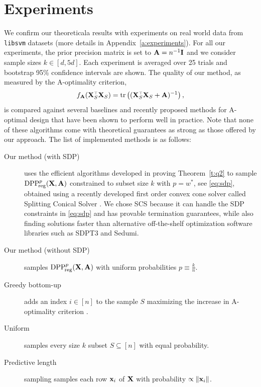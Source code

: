 \section{Experiments}\label{s:bayesian:experiments}
We confirm our theoreticala
results with experiments on real world data from \texttt{libsvm} datasets
\citep{libsvm} (more details in Appendix~\ref{a:experiments}).
For all our experiments, the prior precision matrix is set to $\mathbf A = n^{-1} \mathbf I$
and we consider sample sizes $k \in [d, 5d]$. Each experiment is
averaged over 25 trials and bootstrap 95\% confidence intervals are shown.
The quality of our method, as measured by the A-optimality
criterion,
\[f_{\A}(\X_S^\top \X_S) = \tr \left((\X_S^\top \X_S + \A)^{-1}\right),\]
is compared against several baselines and recently proposed methods
for A-optimal design that have been shown to perform well in
practice. Note that none of these algorithms come with theoretical
guarantees as strong as those offered by our approach. The list of
implemented methods is as follows:
\begin{description}
    \item[Our method (with SDP)] uses the efficient algorithms
        developed in proving Theorem~\ref{t:q2} to sample
        ${{\mathrm{DPP}}_{\!\mathrm{reg}}^{p}}(\mathbf X,\mathbf A)$ constrained to subset size $k$
        with $p = w^*$, see \eqref{eq:sdp},
        obtained using a         recently developed first order convex cone solver called Splitting
        Conical Solver \citep[SCS, see][]{o2016conic}.
        We chose SCS because it can handle the SDP constraints in
        \eqref{eq:sdp} and has provable termination guarantees, while
        also finding solutions faster \citep{o2016conic} than alternative
        off-the-shelf optimization software libraries such as SDPT3
        and Sedumi.

    \item[Our method (without SDP)] samples ${{\mathrm{DPP}}_{\!\mathrm{reg}}^{p}}(\mathbf X,\mathbf A)$ with uniform
        probabilities $p \equiv \frac{k}{n}$.

    \item[Greedy bottom-up] adds an index $i \in [n]$ to the sample $S$
        maximizing the increase in A-optimality criterion
        \citep{greedy-supermodular,chamon2017approximate}.

    \item[Uniform] samples every size $k$ subset $S \subseteq [n]$
        with equal probability.

    \item[Predictive length] sampling \citep{zhu2015optimal} samples
        each row $\mathbf x_i$ of $\mathbf X$ with probability $\propto\|\mathbf x_i\|$.
\end{description}


